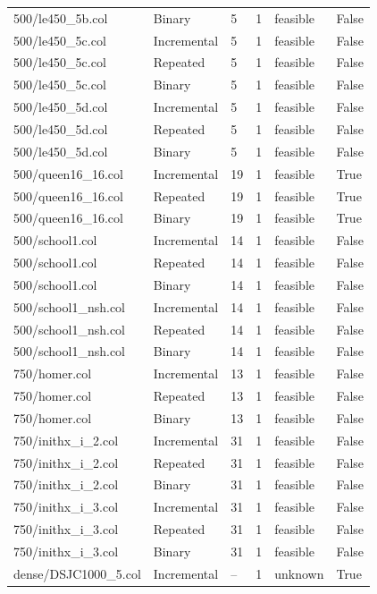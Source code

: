 \begin{table}[htbp]
\begin{tabular}{llllll}
500/le450\_5b.col & Binary & 5 & 1 & feasible & False \\
500/le450\_5c.col & Incremental & 5 & 1 & feasible & False \\
500/le450\_5c.col & Repeated & 5 & 1 & feasible & False \\
500/le450\_5c.col & Binary & 5 & 1 & feasible & False \\
500/le450\_5d.col & Incremental & 5 & 1 & feasible & False \\
500/le450\_5d.col & Repeated & 5 & 1 & feasible & False \\
500/le450\_5d.col & Binary & 5 & 1 & feasible & False \\
500/queen16\_16.col & Incremental & 19 & 1 & feasible & True \\
500/queen16\_16.col & Repeated & 19 & 1 & feasible & True \\
500/queen16\_16.col & Binary & 19 & 1 & feasible & True \\
500/school1.col & Incremental & 14 & 1 & feasible & False \\
500/school1.col & Repeated & 14 & 1 & feasible & False \\
500/school1.col & Binary & 14 & 1 & feasible & False \\
500/school1\_nsh.col & Incremental & 14 & 1 & feasible & False \\
500/school1\_nsh.col & Repeated & 14 & 1 & feasible & False \\
500/school1\_nsh.col & Binary & 14 & 1 & feasible & False \\
750/homer.col & Incremental & 13 & 1 & feasible & False \\
750/homer.col & Repeated & 13 & 1 & feasible & False \\
750/homer.col & Binary & 13 & 1 & feasible & False \\
750/inithx\_i\_2.col & Incremental & 31 & 1 & feasible & False \\
750/inithx\_i\_2.col & Repeated & 31 & 1 & feasible & False \\
750/inithx\_i\_2.col & Binary & 31 & 1 & feasible & False \\
750/inithx\_i\_3.col & Incremental & 31 & 1 & feasible & False \\
750/inithx\_i\_3.col & Repeated & 31 & 1 & feasible & False \\
750/inithx\_i\_3.col & Binary & 31 & 1 & feasible & False \\
dense/DSJC1000\_5.col & Incremental & -- & 1 & unknown & True \\

\end{tabular}
\end{table}
